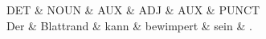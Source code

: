 \begin{figure}
\begin{dependency}
    \begin{deptext}
        DET \& NOUN \& AUX \& ADJ \& AUX \& PUNCT \\
        Der \& Blattrand \& kann \& bewimpert \& sein \& . \\
        \end{deptext}
\end{dependency}
\end{figure}
